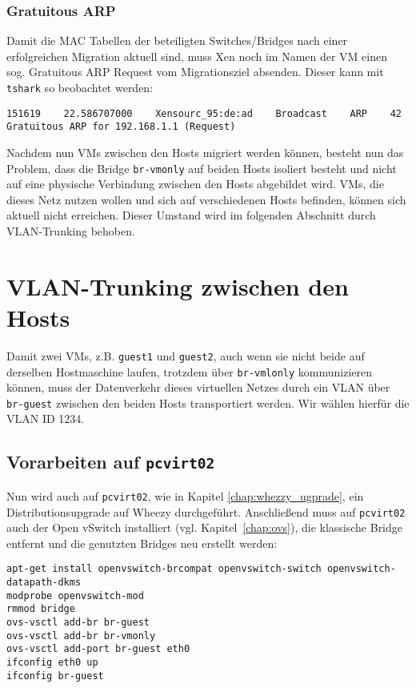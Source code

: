 \subsection{Gratuitous ARP}
\label{Gratuitous}

Damit die MAC Tabellen der beteiligten Switches/Bridges nach einer erfolgreichen Migration aktuell sind, muss Xen noch im Namen der VM einen sog. Gratuitous ARP Request vom Migrationsziel absenden. Dieser kann mit \verb#tshark# so beobachtet werden:

\setupVerbatimOut
\begin{verbatim}
151619    22.586707000    Xensourc_95:de:ad    Broadcast    ARP    42    Gratuitous ARP for 192.168.1.1 (Request)
\end{verbatim}

Nachdem nun VMs zwischen den Hosts migriert werden können, besteht nun das Problem, dass die Bridge \verb#br-vmonly# auf beiden Hosts isoliert besteht und nicht auf eine physische Verbindung zwischen den Hosts abgebildet wird. VMs, die dieses Netz nutzen wollen und sich auf verschiedenen Hosts befinden, können sich aktuell nicht erreichen. Dieser Umstand wird im folgenden Abschnitt durch VLAN-Trunking behoben.

\chapter{VLAN-Trunking zwischen den Hosts}
\label{vlan_trunk}
Damit zwei VMs, z.B. \verb#guest1# und \verb#guest2#, auch wenn sie nicht beide auf derselben Hostmaschine laufen, trotzdem über \verb#br-vmlonly# kommunizieren können, muss der Datenverkehr dieses virtuellen Netzes durch ein VLAN über \verb#br-guest# zwischen den beiden Hosts transportiert werden. Wir wählen hierfür die VLAN ID 1234.

\section {Vorarbeiten auf  \texttt{pcvirt02}}\label{ovs2}
Nun wird auch auf \verb#pcvirt02#, wie in Kapitel \ref{chap:whezzy_ugprade}, ein Distributionsupgrade auf Wheezy durchgeführt. Anschließend muss auf \verb#pcvirt02#  auch der Open vSwitch installiert (vgl. Kapitel~\ref{chap:ovs}), die klassische Bridge entfernt und die genutzten Bridges neu erstellt werden:
\begin{verbatim}
apt-get install openvswitch-brcompat openvswitch-switch openvswitch-datapath-dkms
modprobe openvswitch-mod
rmmod bridge
ovs-vsctl add-br br-guest
ovs-vsctl add-br br-vmonly
ovs-vsctl add-port br-guest eth0
ifconfig eth0 up
ifconfig br-guest
\end{verbatim}

